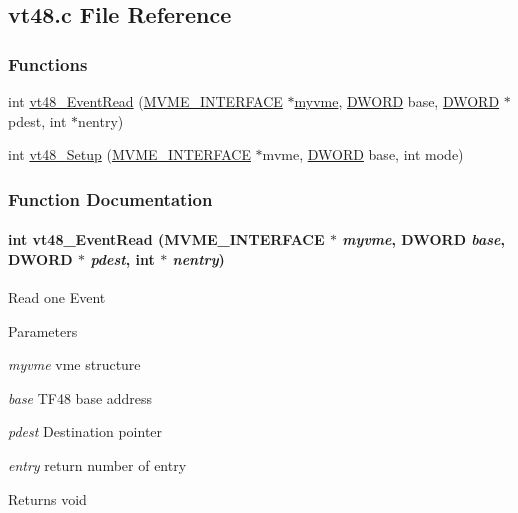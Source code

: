 \subsection{vt48.c File Reference}
\label{vt48_8c}
\subsubsection*{Functions}
\begin{DoxyCompactItemize}
\item 
int \hyperlink{vt48_8c_a1cefc6582d808ef387ecc7016d9577fa}{vt48\_\-EventRead} (\hyperlink{structMVME__INTERFACE}{MVME\_\-INTERFACE} $\ast$\hyperlink{fevmemodules_8c_aeab89db2ad759342a32dcd50a0a0156c}{myvme}, \hyperlink{vt2_8h_a798af1e30bc65f319c1a246cecf59e39}{DWORD} base, \hyperlink{vt2_8h_a798af1e30bc65f319c1a246cecf59e39}{DWORD} $\ast$pdest, int $\ast$nentry)
\item 
int \hyperlink{vt48_8c_aa6237edcb797fb9ebb0d447a5b1edbcd}{vt48\_\-Setup} (\hyperlink{structMVME__INTERFACE}{MVME\_\-INTERFACE} $\ast$mvme, \hyperlink{vt2_8h_a798af1e30bc65f319c1a246cecf59e39}{DWORD} base, int mode)
\end{DoxyCompactItemize}


\subsubsection{Function Documentation}
\paragraph[{vt48\_\-EventRead}]{\setlength{\rightskip}{0pt plus 5cm}int vt48\_\-EventRead ({\bf MVME\_\-INTERFACE} $\ast$ {\em myvme}, \/  {\bf DWORD} {\em base}, \/  {\bf DWORD} $\ast$ {\em pdest}, \/  int $\ast$ {\em nentry})}\hfill\label{vt48_8c_a1cefc6582d808ef387ecc7016d9577fa}
Read one Event 
\begin{DoxyParams}{Parameters}
\item[{\em myvme}]vme structure \item[{\em base}]TF48 base address \item[{\em pdest}]Destination pointer \item[{\em entry}]return number of entry \end{DoxyParams}
\begin{DoxyReturn}{Returns}
void 
\end{DoxyReturn}


